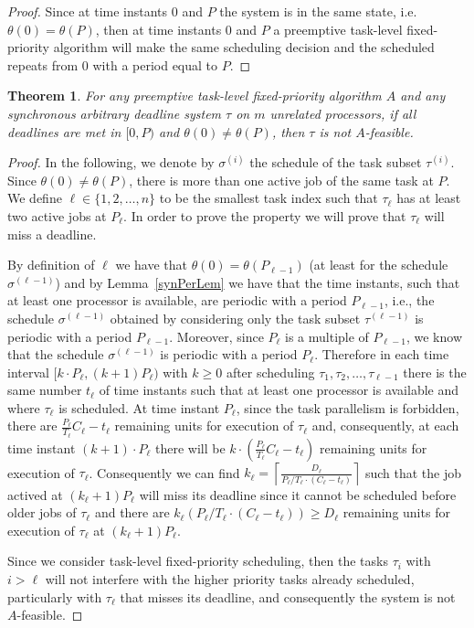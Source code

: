 \documentclass[a4paper,11pt]{article}
\newtheorem{Theorem}{Theorem}
\begin{document}
\begin{proof}
  Since at time instants $0$ and $P$ the system is in the same state,
  i.e. $\theta(0) =\theta(P)$, then at time instants $0$ and $P$ a
  preemptive task-level fixed-priority algorithm will make the same scheduling
  decision and the scheduled repeats from $0$ with a period equal to
  $P$.
\end{proof}

\begin{Theorem} \label{synPerNotFeb}
For any preemptive task-level fixed-priority algorithm $A$ and any synchronous
arbitrary deadline system $\tau$ on $m$ unrelated processors, if all deadlines are met in $[0,P)$ and $\theta(0) \neq \theta(P)$, then $\tau$ is not $A$-feasible.
\end{Theorem}

\begin{proof} 
In the following, we denote by $\sigma^{(i)}$ the schedule of the task subset $\tau^{(i)}$. Since $\theta(0) \neq \theta(P)$, there is more than one active job of the same task at $P$. We define $\ell \in \{1, 2, \ldots, n \}$ to be the smallest task index such that $\tau_{\ell}$ has at least two active jobs at $P_{\ell}$. In order to prove the property we will prove that $\tau_{\ell}$ will miss a deadline.

By definition of $\ell$ we have that $\theta(0) = \theta(P_{\ell-1})$ (at least for the schedule $\sigma^{(\ell-1)}$) and
by Lemma~\ref{synPerLem} we have that the time instants, such that at
least one processor is available, are periodic with a period
$P_{\ell-1}$, i.e., the schedule $\sigma^{(\ell-1)}$ obtained by
considering only the task subset $\tau^{(\ell-1)}$ is periodic with
a period $P_{\ell-1}$. Moreover, since $P_{\ell}$ is a multiple of
$P_{\ell-1}$, we know that the schedule $\sigma^{(\ell-1)}$ is periodic with
a period $P_{\ell}$. Therefore in each time interval $[ k \cdot
P_{\ell},(k+1) P_{\ell})$ with $k \geq 0$ after scheduling $\tau_1,
\tau_2, \ldots, \tau_{\ell -1}$ there is the same number $t_{\ell}$ of
time instants such that at least one processor is available and where
$\tau_{\ell}$ is scheduled. At time instant $P_{\ell}$, since the task
parallelism is forbidden, there are $\frac{P_{\ell}}{T_{\ell}} C_{\ell}-t_{\ell}$
remaining units for execution of $\tau_{\ell}$ and, consequently,
at each time instant $(k+1) \cdot P_{\ell}$ there will be $k \cdot
(\frac{P_{\ell}}{T_{\ell}} C_{\ell}-t_{\ell})$ remaining units for
execution of $\tau_{\ell}$. Consequently we can find $k_{\ell}= \left\lceil
\frac {D_{\ell}}{{P_{\ell}}/{T_{\ell}} \cdot (C_{\ell}-t_{\ell})} \right\rceil$ such that the job actived at $(k_{\ell}+1)P_{\ell}$ will miss its deadline
since it cannot be scheduled before older jobs of $\tau_{\ell}$ and
there are $k_{\ell}({P_{\ell}}/{T_{\ell}} \cdot (C_{\ell}-t_{\ell})) \geq
D_{\ell}$ remaining units for execution of $\tau_{\ell}$ at
$(k_{\ell}+1)P_{\ell}$.

Since we consider task-level fixed-priority scheduling, then the
tasks $\tau_i$ with $i > \ell$ will not interfere with the higher
priority tasks already scheduled, particularly with $\tau_{\ell}$
that misses its deadline, and consequently the system is not
$A$-feasible.
\end{proof}
\end{document}
